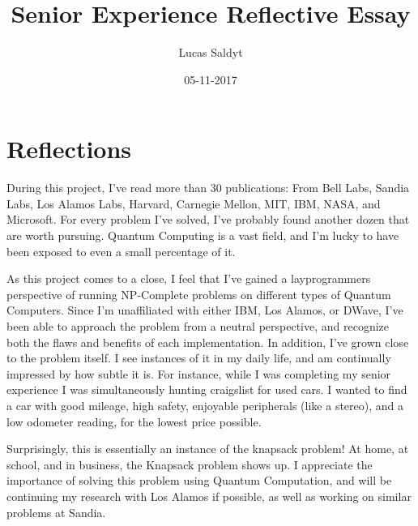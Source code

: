 \documentclass{article}
\title{Senior Experience Reflective Essay}
\date{05-11-2017}
\author{Lucas Saldyt}
\begin{document}
\maketitle
{}
\newpage
{}

\section{Reflections}

During this project, I've read more than 30 publications: From Bell Labs, Sandia Labs, Los Alamos Labs, Harvard, Carnegie Mellon, MIT, IBM, NASA, and Microsoft.
For every problem I've solved, I've probably found another dozen that are worth pursuing.
Quantum Computing is a vast field, and I'm lucky to have been exposed to even a small percentage of it.

As this project comes to a close, I feel that I've gained a layprogrammers perspective of running NP-Complete problems on different types of Quantum Computers.
Since I'm unaffiliated with either IBM, Los Alamos, or DWave, I've been able to approach the problem from a neutral perspective, and recognize both the flaws and benefits of each implementation.
In addition, I've grown close to the problem itself. I see instances of it in my daily life, and am continually impressed by how subtle it is.
For instance, while I was completing my senior experience I was simultaneously hunting craigslist for used cars.
I wanted to find a car with good mileage, high safety, enjoyable peripherals (like a stereo), and a low odometer reading, for the lowest price possible. 

Surprisingly, this is essentially an instance of the knapsack problem! 
At home, at school, and in business, the Knapsack problem shows up.
I appreciate the importance of solving this problem using Quantum Computation, and will be continuing my research with Los Alamos if possible, as well as working on similar problems at Sandia.
\end{document}
